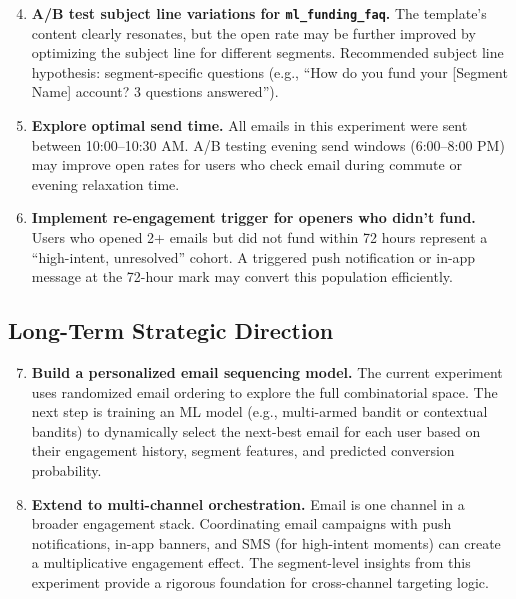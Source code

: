 \documentclass[12pt,a4paper]{article}
\begin{document}
\begin{enumerate}[leftmargin=2em, label=\textbf{\arabic*.}]
  \setcounter{enumi}{3}

  \item \textbf{A/B test subject line variations for \texttt{ml\_funding\_faq}.}
    The template's content clearly resonates, but the open rate may be further
    improved by optimizing the subject line for different segments. Recommended
    subject line hypothesis: segment-specific questions (e.g., ``How do you fund
    your [Segment Name] account? 3 questions answered'').

  \item \textbf{Explore optimal send time.}
    All emails in this experiment were sent between 10:00--10:30 AM. A/B testing
    evening send windows (6:00--8:00 PM) may improve open rates for users who check
    email during commute or evening relaxation time.

  \item \textbf{Implement re-engagement trigger for openers who didn't fund.}
    Users who opened 2+ emails but did not fund within 72 hours represent a
    ``high-intent, unresolved'' cohort. A triggered push notification or in-app
    message at the 72-hour mark may convert this population efficiently.

\end{enumerate}

\subsection{Long-Term Strategic Direction}

\begin{enumerate}[leftmargin=2em, label=\textbf{\arabic*.}]
  \setcounter{enumi}{6}

  \item \textbf{Build a personalized email sequencing model.}
    The current experiment uses randomized email ordering to explore the full
    combinatorial space. The next step is training an ML model (e.g., multi-armed
    bandit or contextual bandits) to dynamically select the next-best email for
    each user based on their engagement history, segment features, and predicted
    conversion probability.

  \item \textbf{Extend to multi-channel orchestration.}
    Email is one channel in a broader engagement stack. Coordinating email
    campaigns with push notifications, in-app banners, and SMS (for high-intent
    moments) can create a multiplicative engagement effect. The segment-level
    insights from this experiment provide a rigorous foundation for cross-channel
    targeting logic.

\end{enumerate}
\end{document}
